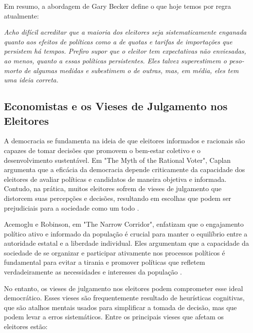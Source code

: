 Em resumo, a abordagem de Gary Becker define o que hoje temos por regra atualmente:

\begin{citacao}
    \textit{Acho difícil acreditar que a maioria dos eleitores seja sistematicamente enganada quanto aos efeitos de políticas como a de quotas e tarifas de importações que persistem há tempos. Prefiro supor que o eleitor tem expectativas não enviesadas, ao menos, quanto a essas políticas persistentes. Eles talvez superestimem o peso-morto de algumas medidas e subestimem o de outras, mas, em média, eles tem uma ideia correta.
    } \newline \cite{becker1976}
\end{citacao}

\subsection{Economistas e os Vieses de Julgamento nos Eleitores}

A democracia se fundamenta na ideia de que eleitores informados e racionais são capazes de tomar decisões que promovem o bem-estar coletivo e o desenvolvimento sustentável. Em "The Myth of the Rational Voter", Caplan argumenta que a eficácia da democracia depende criticamente da capacidade dos eleitores de avaliar políticas e candidatos de maneira objetiva e informada. Contudo, na prática, muitos eleitores sofrem de vieses de julgamento que distorcem suas percepções e decisões, resultando em escolhas que podem ser prejudiciais para a sociedade como um todo \cite{The_Myth_of_the_Rational_Voter}.

Acemoglu e Robinson, em "The Narrow Corridor", enfatizam que o engajamento político ativo e informado da população é crucial para manter o equilíbrio entre a autoridade estatal e a liberdade individual. Eles argumentam que a capacidade da sociedade de se organizar e participar ativamente nos processos políticos é fundamental para evitar a tirania e promover políticas que refletem verdadeiramente as necessidades e interesses da população \cite{acemoglu2019narrow}.

No entanto, os vieses de julgamento nos eleitores podem comprometer esse ideal democrático. Esses vieses são frequentemente resultado de heurísticas cognitivas, que são atalhos mentais usados para simplificar a tomada de decisão, mas que podem levar a erros sistemáticos. Entre os principais vieses que afetam os eleitores estão:

